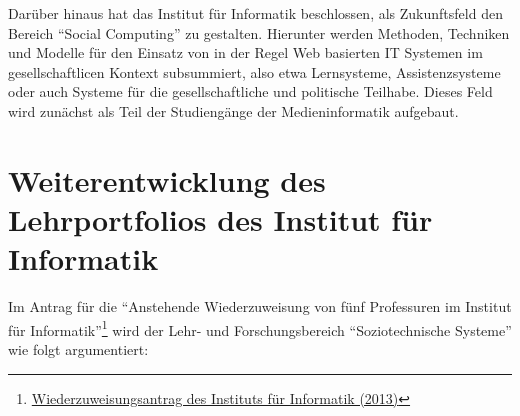 Darüber hinaus hat das Institut für Informatik beschlossen, als
Zukunftsfeld den Bereich ``Social Computing'' zu gestalten. Hierunter
werden Methoden, Techniken und Modelle für den Einsatz von in der Regel
Web basierten IT Systemen im gesellschaftlicen Kontext subsummiert, also
etwa Lernsysteme, Assistenzsysteme oder auch Systeme für die
gesellschaftliche und politische Teilhabe. Dieses Feld wird zunächst als
Teil der Studiengänge der Medieninformatik aufgebaut.

\section{Weiterentwicklung des Lehrportfolios des Institut für
Informatik}\label{weiterentwicklung-des-lehrportfolios-des-institut-fuxfcr-informatik}

Im Antrag für die ``Anstehende Wiederzuweisung von fünf Professuren im
Institut für Informatik''\footnote{\href{https://th-koeln.github.io/mi-2017/anhaenge/inst-AntragWiederzuweisung_Motivation_2013.pdf}{Wiederzuweisungsantrag
  des Instituts für Informatik (2013)}} wird der Lehr- und
Forschungsbereich ``Soziotechnische Systeme'' wie folgt argumentiert:

